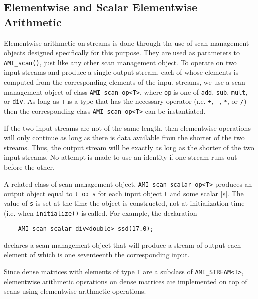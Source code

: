 
\subsection{Elementwise and Scalar Elementwise Arithmetic}
\label{sec:ref-ami-arith}


Elementwise arithmetic on streams is done through the use of scan
management objects designed specifically for this purpose.  They are
used as parameters to \verb|AMI_scan()|, just like any other scan
management object.  To operate on two input streams and produce a
single output stream, each of whose elements is computed from the
corresponding elements of the input streams, we use a scan management
object of class \verb|AMI_scan_op<T>|, where \verb|op| is one of
\verb|add|, \verb|sub|, \verb|mult|, or \verb|div|.  As long as
\verb|T| is a type that has the necessary operator (i.e. \verb|+|,
\verb|-|, \verb|*|, or \verb|/|) then the corresponding class
\verb|AMI_scan_op<T>| can be instantiated.

If the two input streams are not of the same length, then elementwise
operations will only continue as long as there is data available from
the shorter of the two streams.  Thus, the output stream will be
exactly as long as the shorter of the two input streams.  No attempt
is made to use an identity if one stream runs out before the other.

A related class of scan management object,
\verb|AMI_scan_scalar_op<T>| produces an output object equal to
\verb|t op s| for each input object \verb|t| and some scalar |s|.
The value of \verb|s| is set at the time the object is constructed,
not at initialization time (i.e. when \verb|initialize()| is called.
For example, the declaration
\begin{verbatim}
    AMI_scan_scalar_div<double> ssd(17.0);
\end{verbatim}
declares a scan management object that will produce a stream of output
each element of which is one seventeenth the corresponding input.

Since dense matrices with elements of type \verb|T| are a subclass of
\verb|AMI_STREAM<T>|, elementwise arithmetic operations on dense
matrices are implemented on top of scans using elementwise arithmetic
operations.

